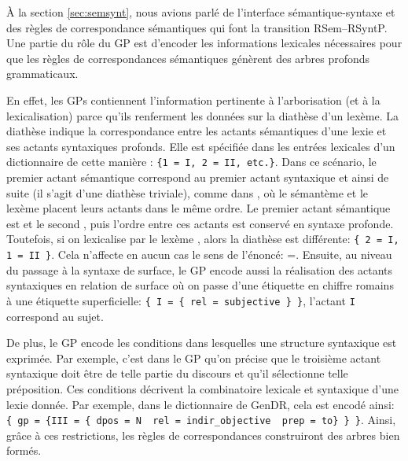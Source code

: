 À la section \ref{sec:semsynt}, nous avions parlé de l'interface sémantique-syntaxe et des règles de correspondance sémantiques qui font la transition \ac{RSem}--\ac{RSyntP}. Une partie du rôle du \ac{GP} est d'encoder les informations lexicales nécessaires pour que les règles de correspondances sémantiques génèrent des arbres profonds grammaticaux. 

En effet, les \acp{GP} contiennent l'information pertinente à l'arborisation (et à la lexicalisation) parce qu'ils renferment les données sur la diathèse d'un lexème. La diathèse indique la correspondance entre les actants sémantiques d'une lexie et ses actants syntaxiques profonds. Elle est spécifiée dans les entrées lexicales d'un dictionnaire de cette manière : \lstinline|{1 = I, 2 = II, etc.}|. Dans ce scénario, le premier actant sémantique correspond au premier actant syntaxique et ainsi de suite (il s'agit d'une diathèse triviale), comme dans , où le sémantème  et le lexème  placent leurs actants dans le même ordre. Le premier actant sémantique est  et le second , puis l'ordre entre ces actants est conservé en syntaxe profonde. Toutefois, si on lexicalise  par le lexème , alors la diathèse est différente: \lstinline|{ 2 = I, 1 = II }|. Cela n'affecte en aucun cas le sens de l'énoncé: =. Ensuite, au niveau du passage à la syntaxe de surface, le \ac{GP} encode aussi la réalisation des actants syntaxiques en relation de surface où on passe d'une étiquette en chiffre romains à une étiquette superficielle: \lstinline|{ I = { rel = subjective } }|, l'actant \texttt{I} correspond au sujet.

De plus, le \ac{GP} encode les conditions dans lesquelles une structure syntaxique est exprimée. Par exemple, c'est dans le \ac{GP} qu'on précise que le troisième actant syntaxique doit être de telle partie du discours et qu'il sélectionne telle préposition. Ces conditions décrivent la combinatoire lexicale et syntaxique d'une lexie donnée. Par exemple, dans le dictionnaire de GenDR, cela est encodé ainsi: \lstinline|{ gp = {III = { dpos = N  rel = indir_objective  prep = to} } }|. Ainsi, grâce à ces restrictions, les règles de correspondances construiront des arbres bien formés.


